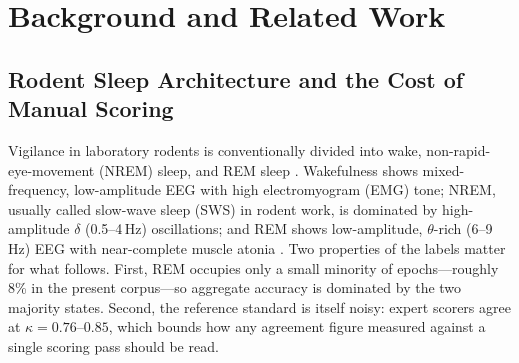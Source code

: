 


\section{Background and Related Work}
\label{sec:related}

\subsection{Rodent Sleep Architecture and the Cost of Manual Scoring}
Vigilance in laboratory rodents is conventionally divided into wake, non-rapid-eye-movement (NREM) sleep, and REM sleep \citep{rechtschaffen2002sleep}. Wakefulness shows mixed-frequency, low-amplitude EEG with high electromyogram (EMG) tone; NREM, usually called slow-wave sleep (SWS) in rodent work, is dominated by high-amplitude $\delta$ (0.5--4\,Hz) oscillations; and REM shows low-amplitude, $\theta$-rich (6--9\,Hz) EEG with near-complete muscle atonia \citep{walker2009role}. Two properties of the labels matter for what follows. First, REM occupies only a small minority of epochs---roughly 8\% in the present corpus---so aggregate accuracy is dominated by the two majority states. Second, the reference standard is itself noisy: expert scorers agree at $\kappa = 0.76$--$0.85$, which bounds how any agreement figure measured against a single scoring pass should be read.

